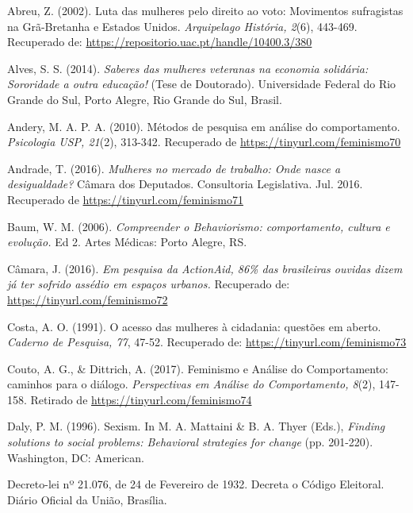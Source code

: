 \hangindent=25pt
\noindent Abreu, Z. (2002). Luta das mulheres pelo direito ao voto: Movimentos sufragistas na Grã-Bretanha e Estados Unidos. \textit{Arquipelago História, 2}(6), 443-469. Recuperado de: \url{https://repositorio.uac.pt/handle/10400.3/380}

\hangindent=25pt
\noindent Alves, S. S. (2014). \textit{Saberes das mulheres veteranas na economia solidária: Sororidade a outra educação!} (Tese de Doutorado). Universidade Federal do Rio Grande do Sul, Porto Alegre, Rio Grande do Sul, Brasil.

\hangindent=25pt
\noindent Andery, M. A. P. A. (2010). Métodos de pesquisa em análise do comportamento. \textit{Psicologia USP, 21}(2), 313-342. Recuperado de \url{https://tinyurl.com/feminismo70}

\hangindent=25pt
\noindent Andrade, T. (2016). \textit{Mulheres no mercado de trabalho: Onde nasce a desigualdade?} Câmara dos Deputados. Consultoria Legislativa. Jul. 2016. Recuperado de \url{https://tinyurl.com/feminismo71}

\hangindent=25pt
\noindent Baum, W. M. (2006). \textit{Compreender o Behaviorismo: comportamento, cultura e evolução.} Ed 2. Artes Médicas: Porto Alegre, RS.

\hangindent=25pt
\noindent Câmara, J. (2016). \textit{Em pesquisa da ActionAid, 86\% das brasileiras ouvidas dizem já ter sofrido assédio em espaços urbanos.} Recuperado de: \url{https://tinyurl.com/feminismo72}

\hangindent=25pt
\noindent Costa, A. O. (1991). O acesso das mulheres à cidadania: questões em aberto. \textit{Caderno de Pesquisa, 77}, 47-52. Recuperado de: \url{https://tinyurl.com/feminismo73}

\hangindent=25pt
\noindent Couto, A. G., \& Dittrich, A. (2017). Feminismo e Análise do Comportamento: caminhos para o diálogo. \textit{Perspectivas em Análise do Comportamento, 8}(2), 147-158. Retirado de \url{https://tinyurl.com/feminismo74}

\hangindent=25pt
\noindent Daly, P. M. (1996). Sexism. In M. A. Mattaini \& B. A. Thyer (Eds.), \textit{Finding solutions to social problems: Behavioral strategies for change} (pp. 201-220). Washington, DC: American.

\hangindent=25pt
\noindent Decreto-lei nº 21.076, de 24 de Fevereiro de 1932. Decreta o Código Eleitoral. Diário Oficial da União, Brasília. 


